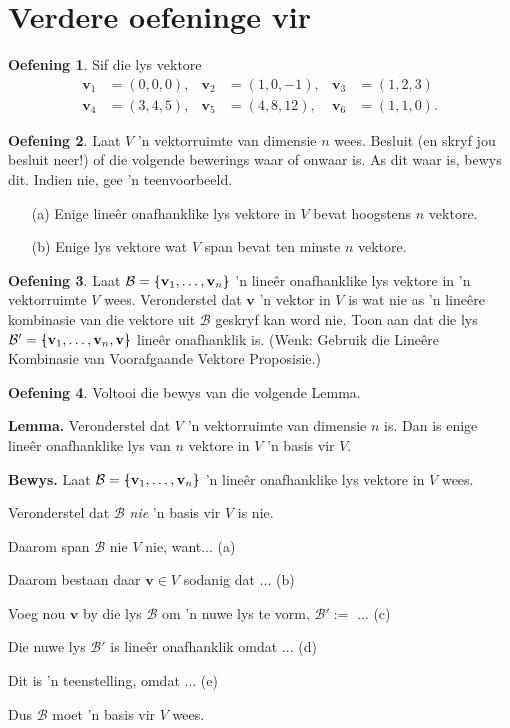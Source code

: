 \documentclass[a4paper,11pt]{book}
\theoremstyle{definition}
\newtheorem{exercise}{Oefening}
\newcommand{\ve}[1]{\mathbf{#1}}
\newcommand{\basis}[1]{{\mathcal #1}}
\newcommand{\furtherexercises}{\section*{Verdere oefeninge vir
\thesection}}
\newcommand{\bmark}{\raisebox{.53ex}{\rule{.2em}{.1ex}}}
\newcommand{\bopen}{{\protect\ooalign{\{\cr\hfil\bmark\hfil\cr}}}
\newcommand{\bclose}{{\protect\ooalign{\}\cr\hfil\bmark\hfil\cr}}}
\begin{document}
\furtherexercises
\begin{exercise} Sif die lys vektore
	\begin{align*}
		\ve{v}_1 &= (0,0,0), & \ve{v}_2 &= (1, 0, -1), & \ve{v}_3 &= (1, 2,
		3) \\
		\ve{v}_4 &= (3, 4, 5), & \ve{v}_5 &= (4, 8, 12), &  \ve{v}_6 &= (1,
		1, 0).
	\end{align*}
\end{exercise}

\begin{exercise} Laat $V$ 'n vektorruimte van dimensie $n$ wees. Besluit
	(en skryf jou besluit neer!) of die volgende bewerings waar of onwaar
	is. As dit waar is, bewys dit. Indien nie, gee 'n teenvoorbeeld.
	\label{true_false_span_lin_ind}
	\begin{itemize}
		\item[(a)] Enige line{\^e}r onafhanklike lys vektore in $V$ bevat
			hoogstens $n$ vektore.
		\item[(b)] Enige lys vektore wat $V$ span bevat ten minste $n$
			vektore.
	\end{itemize}
\end{exercise}

\begin{exercise} Laat $\basis{B} = \bopen \ve{v}_1, \ldots, \ve{v}_n
	\bclose$ 'n line{\^e}r onafhanklike lys vektore in 'n vektorruimte $V$
	wees. Veronderstel dat $\ve{v}$ 'n vektor in $V$ is wat nie as 'n
	line\^{e}re kombinasie van die vektore uit $\basis{B}$ geskryf kan word
	nie. Toon aan dat die lys $\basis{B}' = \bopen \ve{v}_1, \ldots,
	\ve{v}_n, \ve{v} \bclose$ line\^{e}r onafhanklik is. (Wenk: Gebruik die
	Line\^{e}re Kombinasie van Voorafgaande Vektore Proposisie.)
\end{exercise}

\begin{exercise} \label{n_lin_ind_is_basis} Voltooi die bewys van die
	volgende Lemma.

	{\bf Lemma.} Veronderstel dat $V$ 'n vektorruimte van dimensie $n$ is.
	Dan is enige line{\^e}r onafhanklike lys van $n$ vektore in $V$ 'n
	basis vir $V$.

	{\bf Bewys.}  Laat $\basis{B} = \bopen \ve{v}_1, \ldots, \ve{v}_n
	\bclose$ 'n line\^{e}r onafhanklike lys vektore in $V$ wees.

	Veronderstel dat $\basis{B}$ \emph{nie} 'n basis vir $V$ is nie. 

	Daarom span $\basis{B}$ nie $V$ nie, want... (a) 

	Daarom bestaan daar $\ve{v} \in V$ sodanig dat ... (b)

	Voeg nou $\ve{v}$ by die lys $\basis{B}$ om 'n nuwe lys te vorm,
	$\basis{B}' := $ ... (c)

	Die nuwe lys $\basis{B}'$ is line\^{e}r onafhanklik omdat ... (d)

	Dit is 'n teenstelling, omdat ... (e)

	Dus $\basis{B}$ moet 'n basis vir $V$ wees. 
\end{exercise}
\end{document}
